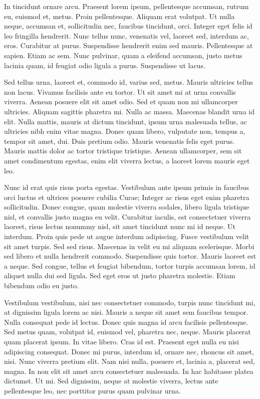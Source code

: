 \documentclass[12pt,twoside,letterpaper]{article}
\begin{document}
In tincidunt ornare arcu. Praesent lorem ipsum, pellentesque accumsan, rutrum eu, euismod et, metus. Proin pellentesque. Aliquam erat volutpat. Ut nulla neque, accumsan et, sollicitudin nec, faucibus tincidunt, orci. Integer eget felis id leo fringilla hendrerit. Nunc tellus nunc, venenatis vel, laoreet sed, interdum ac, eros. Curabitur at purus. Suspendisse hendrerit enim sed mauris. Pellentesque at sapien. Etiam ac sem. Nunc pulvinar, quam a eleifend accumsan, justo metus lacinia quam, id feugiat odio ligula a purus. Suspendisse ut lacus.

Sed tellus urna, laoreet et, commodo id, varius sed, metus. Mauris ultricies tellus non lacus. Vivamus facilisis ante eu tortor. Ut sit amet mi at urna convallis viverra. Aenean posuere elit sit amet odio. Sed et quam non mi ullamcorper ultricies. Aliquam sagittis pharetra mi. Nulla ac massa. Maecenas blandit urna id elit. Nulla mattis, mauris at dictum tincidunt, ipsum urna malesuada tellus, ac ultricies nibh enim vitae magna. Donec quam libero, vulputate non, tempus a, tempor sit amet, dui. Duis pretium odio. Mauris venenatis felis eget purus. Mauris mattis dolor ac tortor tristique tristique. Aenean ullamcorper, sem sit amet condimentum egestas, enim elit viverra lectus, a laoreet lorem mauris eget leo.

Nunc id erat quis risus porta egestas. Vestibulum ante ipsum primis in faucibus orci luctus et ultrices posuere cubilia Curae; Integer ac risus eget enim pharetra sollicitudin. Donec congue, quam molestie viverra sodales, libero ligula tristique nisl, et convallis justo magna eu velit. Curabitur iaculis, est consectetuer viverra laoreet, risus lectus nonummy nisl, sit amet tincidunt nunc mi id neque. Ut interdum. Proin quis pede ut augue interdum adipiscing. Fusce vestibulum velit sit amet turpis. Sed sed risus. Maecenas in velit eu mi aliquam scelerisque. Morbi sed libero et nulla hendrerit commodo. Suspendisse quis tortor. Mauris laoreet est a neque. Sed congue, tellus et feugiat bibendum, tortor turpis accumsan lorem, id aliquet nulla dui sed ligula. Sed eget eros ut justo pharetra molestie. Etiam bibendum odio eu justo.

Vestibulum vestibulum, nisi nec consectetuer commodo, turpis nunc tincidunt mi, at dignissim ligula lorem ac nisi. Mauris a neque sit amet sem faucibus tempor. Nulla consequat pede id lectus. Donec quis magna id arcu facilisis pellentesque. Sed metus quam, volutpat id, euismod vel, pharetra nec, neque. Mauris placerat quam placerat ipsum. In vitae libero. Cras id est. Praesent eget nulla eu nisi adipiscing consequat. Donec mi purus, interdum id, ornare nec, rhoncus sit amet, nisi. Nunc viverra pretium elit. Nam nisi nulla, posuere et, lacinia a, placerat sed, magna. In non elit sit amet arcu consectetuer malesuada. In hac habitasse platea dictumst. Ut mi. Sed dignissim, neque at molestie viverra, lectus ante pellentesque leo, nec porttitor purus quam pulvinar urna.
\end{document}

